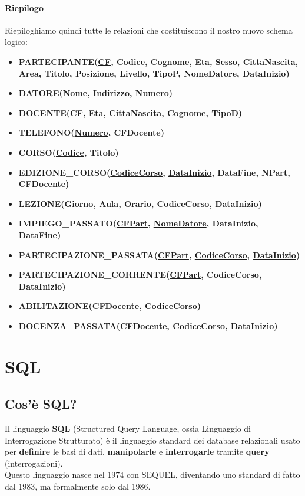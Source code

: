 \documentclass[11pt, a4paper, titlepage, oneside]{scrbook}
\begin{document}
\subsubsection*{Riepilogo}

Riepiloghiamo quindi tutte le relazioni che costituiscono il nostro nuovo schema logico:
\begin{itemize}
    \item \textbf{PARTECIPANTE(\underline{CF}, Codice, Cognome, Eta, Sesso, CittaNascita, Area, Titolo, Posizione, Livello, TipoP, NomeDatore, DataInizio)}
    \item \textbf{DATORE(\underline{Nome}, \underline{Indirizzo}, \underline{Numero})}
    \item \textbf{DOCENTE(\underline{CF}, Eta, CittaNascita, Cognome, TipoD)} 
    \item \textbf{TELEFONO(\underline{Numero}, CFDocente)} 
    \item \textbf{CORSO(\underline{Codice}, Titolo)} 
    \item \textbf{EDIZIONE\_CORSO(\underline{CodiceCorso}, \underline{DataInizio}, DataFine, NPart, CFDocente)}
    \item \textbf{LEZIONE(\underline{Giorno}, \underline{Aula}, \underline{Orario}, CodiceCorso, DataInizio)} 
    \item \textbf{IMPIEGO\_PASSATO(\underline{CFPart}, \underline{NomeDatore}, DataInizio, DataFine)} 
    \item \textbf{PARTECIPAZIONE\_PASSATA(\underline{CFPart}, \underline{CodiceCorso}, \underline{DataInizio})} 
    \item \textbf{PARTECIPAZIONE\_CORRENTE(\underline{CFPart}, CodiceCorso, DataInizio)} 
    \item \textbf{ABILITAZIONE(\underline{CFDocente}, \underline{CodiceCorso})} 
    \item \textbf{DOCENZA\_PASSATA(\underline{CFDocente}, \underline{CodiceCorso}, \underline{DataInizio})}
\end{itemize}

\chapter{SQL}

\section{Cos'è SQL?}

\begin{Definizione}[SQL]
\label{def-SQL}
Il linguaggio \textbf{SQL} (Structured Query Language, ossia Linguaggio di Interrogazione Strutturato) è il linguaggio standard dei database relazionali usato per \textbf{definire} le basi di dati, \textbf{manipolarle} e \textbf{interrogarle} tramite \textbf{query} (interrogazioni).\\
Questo linguaggio nasce nel 1974 con SEQUEL, diventando uno standard di fatto dal 1983, ma formalmente solo dal 1986. 
\end{Definizione}
\end{document}
